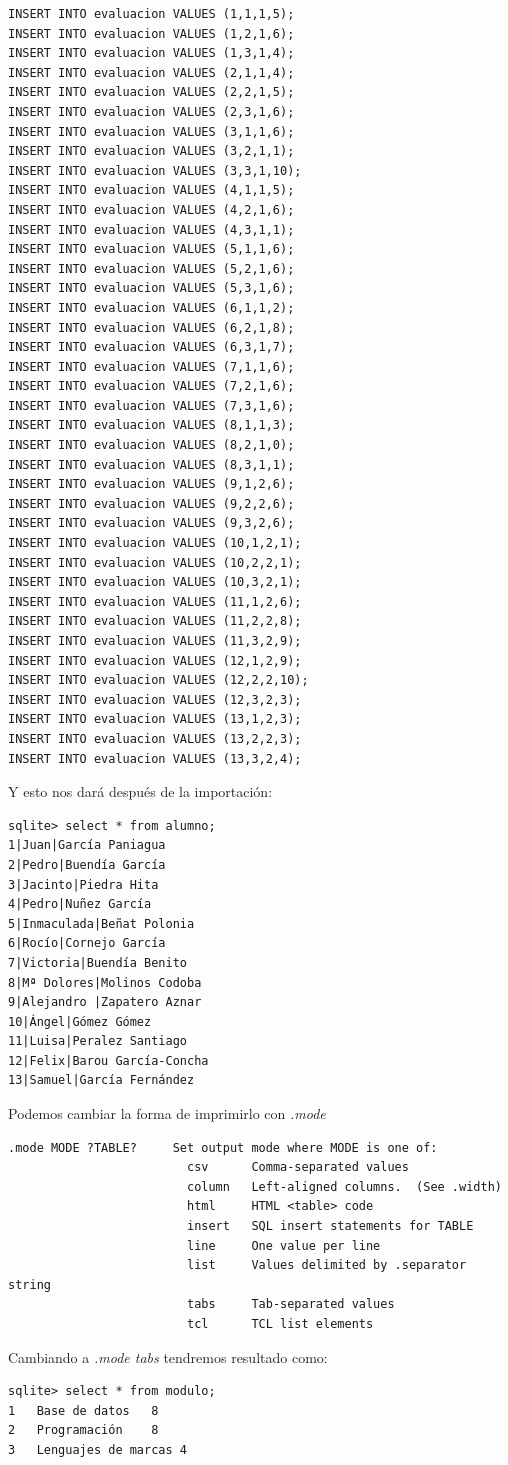 \documentclass[4paper]{article}
\begin{document}
\begin{verbatim}
INSERT INTO evaluacion VALUES (1,1,1,5);
INSERT INTO evaluacion VALUES (1,2,1,6);
INSERT INTO evaluacion VALUES (1,3,1,4);
INSERT INTO evaluacion VALUES (2,1,1,4);
INSERT INTO evaluacion VALUES (2,2,1,5);
INSERT INTO evaluacion VALUES (2,3,1,6);
INSERT INTO evaluacion VALUES (3,1,1,6);
INSERT INTO evaluacion VALUES (3,2,1,1);
INSERT INTO evaluacion VALUES (3,3,1,10);
INSERT INTO evaluacion VALUES (4,1,1,5);
INSERT INTO evaluacion VALUES (4,2,1,6);
INSERT INTO evaluacion VALUES (4,3,1,1);
INSERT INTO evaluacion VALUES (5,1,1,6);
INSERT INTO evaluacion VALUES (5,2,1,6);
INSERT INTO evaluacion VALUES (5,3,1,6);
INSERT INTO evaluacion VALUES (6,1,1,2);
INSERT INTO evaluacion VALUES (6,2,1,8);
INSERT INTO evaluacion VALUES (6,3,1,7);
INSERT INTO evaluacion VALUES (7,1,1,6);
INSERT INTO evaluacion VALUES (7,2,1,6);
INSERT INTO evaluacion VALUES (7,3,1,6);
INSERT INTO evaluacion VALUES (8,1,1,3);
INSERT INTO evaluacion VALUES (8,2,1,0);
INSERT INTO evaluacion VALUES (8,3,1,1);
INSERT INTO evaluacion VALUES (9,1,2,6);
INSERT INTO evaluacion VALUES (9,2,2,6);
INSERT INTO evaluacion VALUES (9,3,2,6);
INSERT INTO evaluacion VALUES (10,1,2,1);
INSERT INTO evaluacion VALUES (10,2,2,1);
INSERT INTO evaluacion VALUES (10,3,2,1);
INSERT INTO evaluacion VALUES (11,1,2,6);
INSERT INTO evaluacion VALUES (11,2,2,8);
INSERT INTO evaluacion VALUES (11,3,2,9);
INSERT INTO evaluacion VALUES (12,1,2,9);
INSERT INTO evaluacion VALUES (12,2,2,10);
INSERT INTO evaluacion VALUES (12,3,2,3);
INSERT INTO evaluacion VALUES (13,1,2,3);
INSERT INTO evaluacion VALUES (13,2,2,3);
INSERT INTO evaluacion VALUES (13,3,2,4);
\end{verbatim}
Y esto nos dará después de la importación:
\begin{verbatim}
sqlite> select * from alumno;
1|Juan|García Paniagua
2|Pedro|Buendía García
3|Jacinto|Piedra Hita
4|Pedro|Nuñez García
5|Inmaculada|Beñat Polonia
6|Rocío|Cornejo García
7|Victoria|Buendía Benito
8|Mª Dolores|Molinos Codoba
9|Alejandro |Zapatero Aznar
10|Ángel|Gómez Gómez
11|Luisa|Peralez Santiago
12|Felix|Barou García-Concha
13|Samuel|García Fernández
\end{verbatim}
Podemos cambiar la forma de imprimirlo con \emph{.mode}
\begin{verbatim}
.mode MODE ?TABLE?     Set output mode where MODE is one of:
                         csv      Comma-separated values
                         column   Left-aligned columns.  (See .width)
                         html     HTML <table> code
                         insert   SQL insert statements for TABLE
                         line     One value per line
                         list     Values delimited by .separator string
                         tabs     Tab-separated values
                         tcl      TCL list elements
\end{verbatim}
Cambiando a \emph{.mode tabs} tendremos resultado como:
\begin{verbatim}
sqlite> select * from modulo;
1	Base de datos	8
2	Programación	8
3	Lenguajes de marcas	4
\end{verbatim}
\end{document}
